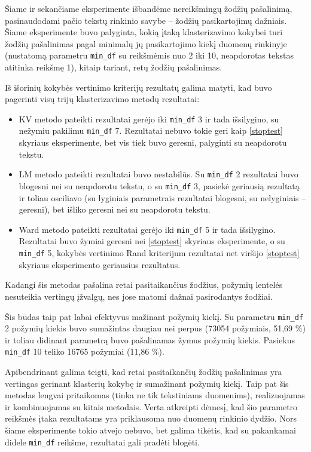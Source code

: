 \documentclass{VUMIFInfBakalaurinis}
\begin{document}
Šiame ir sekančiame eksperimente išbandėme nereikšmingų žodžių
pašalinimą, pasinaudodami pačio tekstų rinkinio savybe -- žodžių
pasikartojimų dažniais. Šiame eksperimente buvo palyginta, kokią įtaką
klasterizavimo kokybei turi žodžių pašalinimas pagal minimalų jų
pasikartojimo kiekį duomenų rinkinyje (nustatomą parametru
\texttt{min\_df} su reikšmėmis nuo 2 iki 10, neapdorotas tekstas
atitinka reikšmę 1), kitaip tariant, retų žodžių pašalinimas.

Iš išorinių kokybės vertinimo kriterijų rezultatų galima matyti, kad buvo pagerinti
visų trijų klasterizavimo metodų rezultatai:

\begin{itemize}
\item
  KV metodo pateikti rezultatai gerėjo iki \texttt{min\_df} 3 ir tada išsilygino, su
  nežymiu pakilimu \texttt{min\_df} 7. Rezultatai nebuvo tokie geri kaip
  \ref{stoptest} skyriaus eksperimente, bet vis tiek buvo geresni, palyginti su
  neapdorotu tekstu.
\item
  LM metodo pateikti rezultatai buvo nestabilūs. Su \texttt{min\_df} 2 rezultatai buvo
  blogesni nei su neapdorotu tekstu, o su \texttt{min\_df} 3, pasiekė geriausią
  rezultatą ir toliau osciliavo (su lyginiais parametrais rezultatai
  blogesni, su nelyginiais -- geresni), bet išliko geresni nei su
  neapdorotu tekstu.
\item
  Ward metodo pateikti rezultatai gerėjo iki \texttt{min\_df} 5 ir tada išsilygino.
  Rezultatai buvo žymiai geresni nei \ref{stoptest} skyriaus eksperimente, o su
  \texttt{min\_df} 5, kokybės vertinimo Rand kriterijum rezultatai net viršijo \ref{stoptest} skyriaus eksperimento
  geriausius rezultatus.
\end{itemize}

Kadangi šis metodas pašalina retai pasitaikančius žodžius, požymių
lentelės nesuteikia vertingų įžvalgų, nes jose matomi dažnai
pasirodantys žodžiai.

Šis būdas taip pat labai efektyvus mažinant požymių kiekį. Su parametru
\texttt{min\_df} 2 požymių kiekis buvo sumažintas daugiau nei perpus (73054
požymiais, 51,69 \%) ir toliau didinant parametrą buvo pašalinamas žymus
požymių kiekis. Pasiekus \texttt{min\_df} 10 teliko 16765 požymiai (11,86 \%).

Apibendrinant galima teigti, kad retai pasitaikančių žodžių pašalinimas
yra vertingas gerinant klasterių kokybę ir sumažinant požymių kiekį.
Taip pat šis metodas lengvai pritaikomas (tinka ne tik tekstiniams
duomenims), realizuojamas ir kombinuojamas su kitais metodais. Verta
atkreipti dėmesį, kad šio parametro reikšmės įtaka rezultatams yra
priklausoma nuo duomenų rinkinio dydžio. Nors šiame eksperimente tokio
atvejo nebuvo, bet galima tikėtis, kad su pakankamai didele
\texttt{min\_df} reikšme, rezultatai gali pradėti blogėti.
\end{document}
